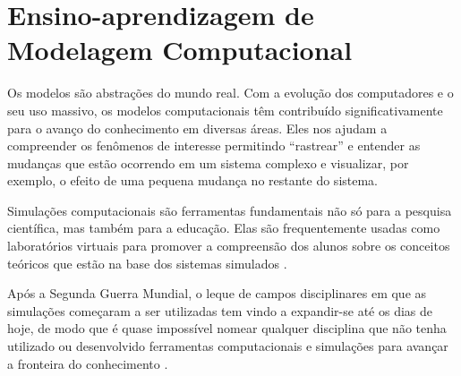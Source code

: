 \documentclass[
	12pt,				%
	openright,			%
	oneside,			%
	a4paper,			%
	main=brazil,
	english,			%
	]{ufsj-abntex2}
\begin{document}





\section{Ensino-aprendizagem de Modelagem Computacional} 

Os modelos são abstrações do mundo real. Com a evolução dos computadores e o seu uso massivo, os modelos computacionais têm contribuído significativamente para o avanço do conhecimento em diversas áreas. Eles nos ajudam a compreender os fenômenos de interesse permitindo “rastrear” e entender as mudanças que estão ocorrendo em um sistema complexo e visualizar, por exemplo, o efeito de uma pequena mudança no restante do sistema. 

Simulações computacionais são ferramentas fundamentais não só para a pesquisa científica, mas também para a educação. Elas são frequentemente usadas como laboratórios virtuais para promover a compreensão dos alunos sobre os conceitos teóricos que estão na base dos sistemas simulados \cite{Eleonora2022}. 

Após a Segunda Guerra Mundial, o leque de campos disciplinares em que as simulações começaram a ser utilizadas tem vindo a expandir-se até os dias de hoje, de modo que é quase impossível nomear qualquer disciplina que não tenha utilizado ou desenvolvido ferramentas computacionais e simulações para avançar a fronteira do conhecimento \cite{Borrelli2019}.
\end{document}
